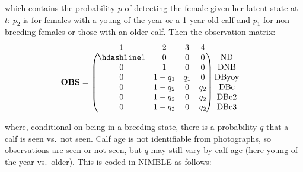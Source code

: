\documentclass[
  12pt,
]{krantz}
\begin{document}
which contains the probability \(p\) of detecting the female given her latent state at \(t\): \(p_2\) is for females with a young of the year or a 1‐year‐old calf and \(p_1\) for non-breeding females or those with an older calf. Then the observation matrix:
\[
\begin{matrix}
& \\
\mathbf{OBS} =
\left ( \vphantom{ \begin{matrix} 12 \\ 12 \\ 12 \\ 12 \\ 12 \\ 12 \end{matrix} } \right .
\end{matrix}
\hspace{-1.2em}
\begin{matrix}
1 & 2 & 3 & 4 \\ \hdashline
1 & 0 & 0 & 0 \\
0 & 1 & 0 & 0 \\
0 & 1 - q_1 & q_1 & 0 \\
0 & 1 - q_2 & 0 & q_2 \\
0 & 1 - q_2 & 0 & q_2 \\
0 & 1 - q_2 & 0 & q_2
\end{matrix}
\hspace{-0.2em}
\begin{matrix}
& \\
\left . \vphantom{ \begin{matrix} 12 \\ 12 \\ 12 \\ 12 \\ 12 \\ 12 \end{matrix} } \right )
\begin{matrix}
\text{ND} \\
\text{DNB} \\
\text{DByoy} \\
\text{DBc} \\
\text{DBc2} \\
\text{DBc3}
\end{matrix}
\end{matrix}
\]

where, conditional on being in a breeding state, there is a probability \(q\) that a calf is seen vs.~not seen. Calf age is not identifiable from photographs, so observations are seen or not seen, but \(q\) may still vary by calf age (here young of the year vs.~older). This is coded in NIMBLE as follows:
\end{document}
